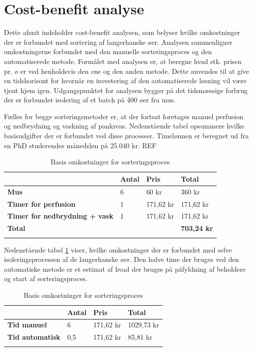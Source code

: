 \newpage
\section{Cost-benefit analyse}
Dette afsnit indeholder cost-benefit analysen, som belyser hvilke omkostninger der er forbundet med sortering af langerhanske øer. Analysen sammenligner omkostningerne forbundet med den manuelle sorteringsproces og den automatiserede metode. Formålet med analysen er, at beregne hvad stk. prisen pr. ø er ved henholdsvis den ene og den anden metode. Dette anvendes til at give en tidshorisont for hvornår en investering af den automatiserede løsning vil være tjent hjem igen. Udgangspunktet for analysen bygger på det tidsmæssige forbrug der er forbundet isolering af et batch på 400 øer fra mus. 

Fælles for begge sorteringsmetoder er, at der fortsat foretages manuel perfusion og nedbrydning og vaskning af pankreas. Nedenstående tabel opsummere hvilke basisudgifter der er forbundet ved disse processer. Timelønnen er beregnet ud fra en PhD studerendes månedsløn på 25.040 kr. REF
\begin{center}
		\begin{longtable}{ | m{6cm} | m{1.5cm} | m{1.5cm} | m{3cm}| } 
			\hline
			 &\textbf{Antal} & \textbf{Pris} & \textbf{Total}\\ 
			\hline
			 \textbf{Mus} & 6 & 60 kr & 360 kr\\ 
			\hline
			 \textbf{Timer for perfusion} & 1 & 171,62 kr & 171,62 kr\\ 
			\hline
			\textbf{Timer for nedbrydning + vask} & 1 & 171,62 kr & 171,62 kr\\ 
			\hline	
			\textbf{Total} &  &  & \textbf{703,24 kr}\\ 
			\hline
			\caption{Basis omkostninger for sorteringsproces}
			 		\end{longtable}
\end{center}
Nedenstående tabel \ref{tab:sortcost} viser, hvilke omkostninger der er forbundet med selve isoleringsprocessen af de langerhanske øer. Den halve time der bruges ved den automatiske metode er et estimat af hvad der bruges på påfyldning af beholdere og start af sorteringsproces. 
\begin{center}
		\begin{longtable}{ | m{6cm} | m{1.5cm} | m{1.5cm} | m{3cm}| } 
			\hline
			 &\textbf{Antal} & \textbf{Pris} & \textbf{Total}\\ 
			\hline
			 \textbf{Tid manuel} & 6 & 171,62 kr & 1029,73 kr\\ 
			\hline
			 \textbf{Tid automatisk} & 0,5 & 171,62 kr & 85,81 kr\\ 
			\hline
			\caption{Basis omkostninger for sorteringsproces}
			\label{tab:sortcost}
			 		\end{longtable}
\end{center}

